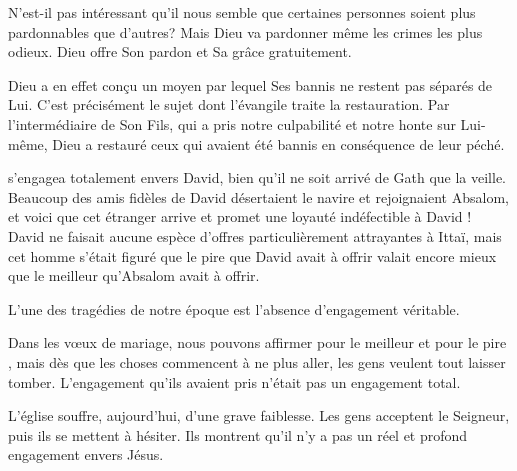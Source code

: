 N'est-il pas intéressant qu'il nous semble que certaines personnes
 soient plus pardonnables que d'autres?
 Mais Dieu va pardonner même les crimes les plus odieux.
 Dieu offre Son pardon et Sa grâce gratuitement. 


Dieu a en effet conçu un moyen par lequel \og Ses bannis \fg{}
 ne restent pas séparés de Lui.
 C'est précisément le sujet dont l'évangile traite \ocadr la restauration.
 Par l'intermédiaire de Son Fils, qui a pris notre culpabilité et notre honte
 sur Lui-même, Dieu a restauré ceux qui avaient été bannis en conséquence
 de leur péché. 

\dvrule






 s'engagea totalement envers David,
 bien qu'il ne soit arrivé de Gath que la veille.
 Beaucoup des amis fidèles de David désertaient le navire
 et rejoignaient Absalom, et voici que cet étranger arrive
 et promet une loyauté indéfectible à David !
 David ne faisait aucune espèce d'offres particulièrement attrayantes
 à Ittaï, mais cet homme s'était figuré que le pire que David avait
 à offrir valait encore mieux que le meilleur qu'Absalom avait à offrir.

L'une des tragédies de notre époque est l'absence d'engagement véritable. 


Dans les v\oe{}ux de mariage, nous pouvons affirmer
 \og pour le meilleur et pour le pire \fg{}, mais dès que les choses
 commencent à ne plus aller, les gens veulent tout laisser tomber.
 L'engagement qu'ils avaient pris n'était pas un engagement total. 

L'église souffre, aujourd'hui, d'une grave faiblesse.
 Les gens acceptent le Seigneur, puis ils se mettent à hésiter.
 Ils montrent qu'il n'y a pas un réel et profond engagement envers Jésus.

